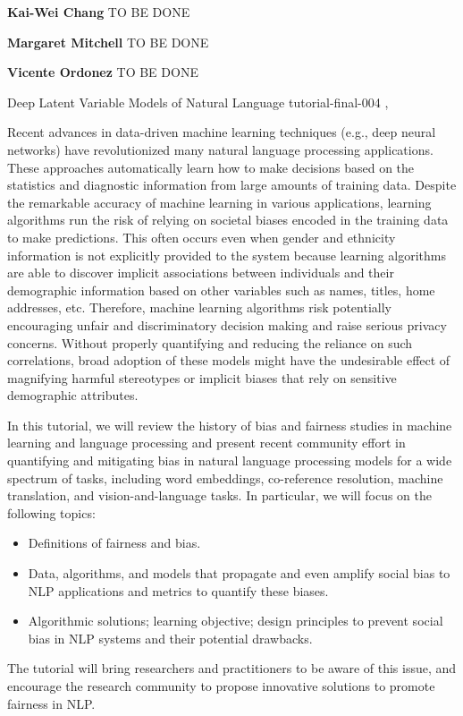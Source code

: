 \begin{bio}

\textbf{Kai-Wei Chang} TO BE DONE

\textbf{Margaret Mitchell} TO BE DONE

\textbf{Vicente Ordonez} TO BE DONE

\end{bio}

\begin{tutorial}
  {Deep Latent Variable Models of Natural Language}
  {tutorial-final-004}
  {\daydateyear, \tutorialmorningtime}
  {\TutLocD}

Recent advances in data-driven machine learning techniques (e.g., deep neural networks) have revolutionized many natural language processing applications. These approaches automatically learn how to make decisions based on the statistics and diagnostic information from large amounts of training data. Despite the remarkable accuracy of machine learning in various applications, learning algorithms run the risk of relying on societal biases encoded in the training data to make predictions. This often occurs even when gender and ethnicity information is not explicitly provided to the system because learning algorithms are able to discover implicit associations between individuals and their demographic information based on other variables such as names, titles, home addresses, etc. Therefore, machine learning algorithms risk potentially encouraging unfair and discriminatory decision making and raise serious privacy concerns. Without properly quantifying and reducing the reliance on such correlations, broad adoption of these models might have the undesirable effect of magnifying harmful stereotypes or implicit biases that rely on sensitive demographic attributes.

In this tutorial, we will review the history of bias and fairness studies in machine learning and language processing and present recent community effort in quantifying and mitigating bias in natural language processing models for a wide spectrum of tasks, including word embeddings, co-reference resolution, machine translation, and vision-and-language tasks. In particular, we will focus on the following topics:
\begin{itemize}
\item Definitions of fairness and bias.

\item Data, algorithms, and models that propagate and even amplify social bias to NLP applications and metrics to quantify these biases.

\item Algorithmic solutions; learning objective; design principles to prevent social bias in NLP systems and their potential drawbacks.
\end{itemize}

The tutorial will bring researchers and practitioners to be aware of this issue, and encourage the research community to propose innovative solutions to promote fairness in NLP.

\end{tutorial}
